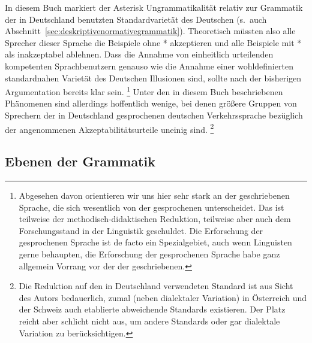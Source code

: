 \begin{exe}
\end{exe}

In diesem Buch markiert der Asterisk Ungrammatikalität relativ zur Grammatik der in Deutschland benutzten Standardvarietät des Deutschen (s.\ auch Abschnitt~\ref{sec:deskriptivenormativegrammatik}).
Theoretisch müssten also alle Sprecher dieser Sprache die Beispiele ohne * akzeptieren und alle Beispiele mit * als inakzeptabel ablehnen.
Dass die Annahme von einheitlich urteilenden kompetenten Sprachbenutzern genauso wie die Annahme einer wohldefinierten standardnahen Varietät des Deutschen Illusionen sind, sollte nach der bisherigen Argumentation bereits klar sein.%
\footnote{Abgesehen davon orientieren wir uns hier sehr stark an der geschriebenen Sprache, die sich wesentlich von der gesprochenen unterscheidet.
Das ist teilweise der methodisch-didaktischen Reduktion, teilweise aber auch dem Forschungsstand in der Linguistik geschuldet.
Die Erforschung der gesprochenen Sprache ist de facto ein Spezialgebiet, auch wenn Linguisten gerne behaupten, die Erforschung der gesprochenen Sprache habe ganz allgemein Vorrang vor der der geschriebenen.}
Unter den in diesem Buch beschriebenen Phänomenen sind allerdings hoffentlich wenige, bei denen größere Gruppen von Sprechern der in Deutschland gesprochenen deutschen Verkehrssprache bezüglich der angenommenen Akzeptabilitätsurteile uneinig sind.%
\footnote{Die Reduktion auf den in Deutschland verwendeten Standard ist aus Sicht des Autors bedauerlich, zumal (neben dialektaler Variation) in Österreich und der Schweiz auch etablierte abweichende Standards existieren.
Der Platz reicht aber schlicht nicht aus, um andere Standards oder gar dialektale Variation zu berücksichtigen.}

\subsection{Ebenen der Grammatik}

\label{sec:ebenendergrammatik}


